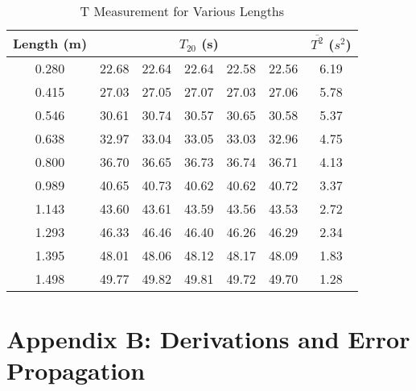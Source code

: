 \documentclass[iop]{emulateapj}
\begin{document}
\begin{figure*}
\begin{table}[H]
\caption{T Measurement for Various Lengths} %
\centering %
\begin{tabular}{c rrrrr c} %
\hline\hline %
Length (m) & \multicolumn{5}{c}{$T_{20}$ (s)} & $\overline{T^2}$ ($s^2$)\\ [0.5ex]
\hline %
0.280 & 22.68 & 22.64 & 22.64 & 22.58 & 22.56 & 6.19\\ %
0.415 & 27.03 & 27.05 & 27.07 & 27.03 & 27.06 & 5.78\\
0.546 & 30.61 & 30.74 & 30.57 & 30.65 & 30.58 & 5.37\\
0.638 & 32.97 & 33.04 & 33.05 & 33.03 & 32.96 & 4.75\\
0.800 & 36.70 & 36.65 & 36.73 & 36.74 & 36.71 & 4.13\\
0.989 & 40.65 & 40.73 & 40.62 & 40.62 & 40.72 & 3.37\\
1.143 & 43.60 & 43.61 & 43.59 & 43.56 & 43.53 & 2.72\\
1.293 & 46.33 & 46.46 & 46.40 & 46.26 & 46.29 & 2.34\\
1.395 & 48.01 & 48.06 & 48.12 & 48.17 & 48.09 & 1.83\\
1.498 & 49.77 & 49.82 & 49.81 & 49.72 & 49.70 & 1.28\\ [1ex] %
\hline %
\end{tabular}
\label{tab:10lengths}
\end{table}

\appendix
{}
\section{Appendix B: Derivations and Error Propagation}



\end{figure*}
\end{document}
